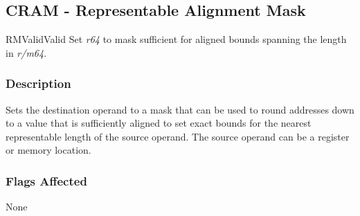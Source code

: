 \clearpage
{}
{}
\subsection*{CRAM - Representable Alignment Mask}

\begin{x86opcodetable}
  {RM}{Valid}{Valid}
  {Set \emph{r64} to mask sufficient for aligned bounds spanning the
    length in \emph{r/m64}.}
\end{x86opcodetable}

\begin{x86opentable}
\end{x86opentable}

\subsubsection*{Description}

Sets the destination operand to a mask that can be used to round
addresses down to a value that is sufficiently aligned to set exact
bounds for the nearest representable length of the source operand.
The source operand can be a register or memory location.

\subsubsection*{Flags Affected}

None
